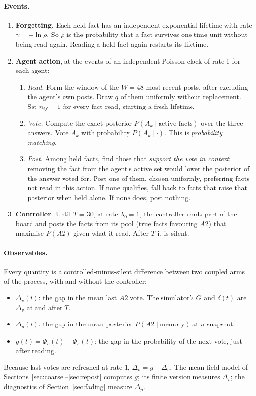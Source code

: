 \documentclass[10pt,a4paper]{article}
\theoremstyle{definition}
\begin{document}
\paragraph{Events.}
\begin{enumerate}
\item \textbf{Forgetting.} Each held fact has an independent exponential lifetime with rate $\gamma=-\ln\rho$. So $\rho$
  is the probability that a fact survives one time unit without being read again. Reading a held fact again restarts
  its lifetime.
\item \textbf{Agent action}, at the events of an independent Poisson clock of rate 1 for each agent:
  \begin{enumerate}
  \item \emph{Read.} Form the window of the $W=48$ most recent posts, after excluding the agent's own posts. Draw $q$
    of them uniformly without replacement. Set $n_{if}=1$ for every fact read, starting a fresh lifetime.
  \item \emph{Vote.} Compute the exact posterior $P(A_k\mid\text{active facts})$ over the three answers. Vote $A_k$
    with probability $P(A_k\mid\cdot)$. This is \emph{probability matching}.
  \item \emph{Post.} Among held facts, find those that \emph{support the vote in context}: removing the fact from the
    agent's active set would lower the posterior of the answer voted for. Post one of them, chosen uniformly,
    preferring facts not read in this action. If none qualifies, fall back to facts that raise that posterior when held
    alone. If none does, post nothing.
  \end{enumerate}
\item \textbf{Controller.} Until $T=30$, at rate $\lambda_0=1$, the controller reads part of the board and posts the
  facts from its pool (true facts favouring $A2$) that maximise $P(A2)$ given what it read. After $T$ it is silent.
\end{enumerate}

\paragraph{Observables.} Every quantity is a controlled-minus-silent difference between two coupled arms of the
process, with and without the controller:
\begin{itemize}
\item $\Delta_v(t)$: the gap in the mean last $A2$ vote. The simulator's $G$ and $\delta(t)$ are $\Delta_v$ at and
  after $T$.
\item $\Delta_p(t)$: the gap in the mean posterior $P(A2\mid\text{memory})$ at a snapshot.
\item $g(t)=\Phi_c(t)-\Phi_s(t)$: the gap in the probability of the next vote, just after reading.
\end{itemize}
Because last votes are refreshed at rate 1, $\dot\Delta_v=g-\Delta_v$. The mean-field model of
Sections~\ref{sec:coarse}--\ref{sec:repost} computes $g$; its finite version measures $\Delta_v$; the diagnostics of
Section~\ref{sec:fading} measure $\Delta_p$.
\end{document}
